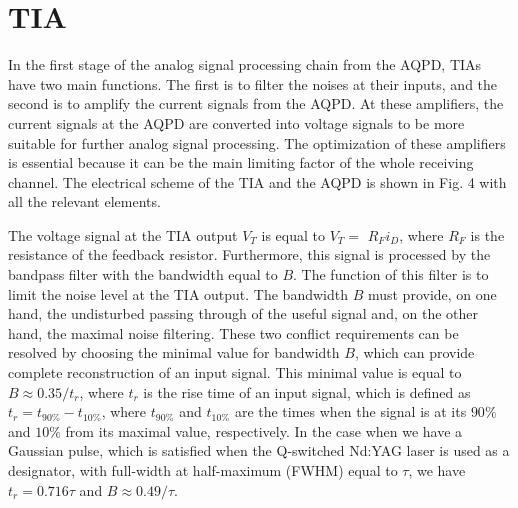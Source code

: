 \documentclass[10pt]{article}
\begin{document}
\section{TIA}
In the first stage of the analog signal processing chain from the AQPD, TIAs have two main functions. The first is to filter the noises at their inputs, and the second is to amplify the current signals from the AQPD. At these amplifiers, the current signals at the AQPD are converted into voltage signals to be more suitable for further analog signal processing. The optimization of these amplifiers is essential because it can be the main limiting factor of the whole receiving channel. The electrical scheme of the TIA and the AQPD is shown in Fig. 4 with all the relevant elements.

The voltage signal at the TIA output \(V_{T}\) is equal to \(V_{T}=\) \(R_{F} i_{D}\), where \(R_{F}\) is the resistance of the feedback resistor. Furthermore, this signal is processed by the bandpass filter with the bandwidth equal to \(B\). The function of this filter is to limit the noise level at the TIA output. The bandwidth \(B\) must provide, on one hand, the undisturbed passing through of the useful signal and, on the other hand, the maximal noise filtering. These two conflict requirements can be resolved by choosing the minimal value for bandwidth \(B\), which can provide complete reconstruction of an input signal. This minimal value is equal to \(B \approx 0.35 / t_{r}\), where \(t_{r}\) is the rise time of an input signal, which is defined as \(t_{r}=t_{90 \%}-t_{10 \%}\), where \(t_{90 \%}\) and \(t_{10 \%}\) are the times when the signal is at its \(90 \%\) and \(10 \%\) from its maximal value, respectively. In the case when we have a Gaussian pulse, which is satisfied when the Q-switched Nd:YAG laser is used as a designator, with full-width at half-maximum (FWHM) equal to \(\tau\), we have \(t_{r}=0.716 \tau\) and \(B \approx 0.49 / \tau\).
\end{document}
